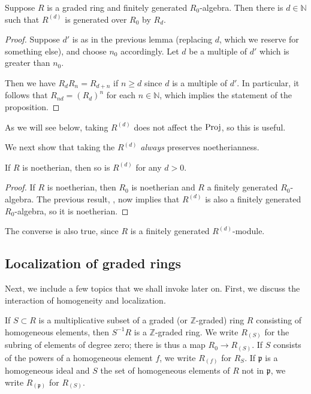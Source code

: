 \begin{proposition} 
Suppose $R$ is a graded ring and finitely generated $R_0$-algebra. Then there
is $d \in \mathbb{N}$ such that $R^{(d)}$ is generated over $R_0$ by $R_d$.
\end{proposition} 
\begin{proof} 
Suppose $d'$ is as in the previous lemma (replacing $d$, which we reserve for
something else), and choose $n_0$ accordingly. Let $d$ be a multiple of $d'$
which is greater than $n_0$.

Then we have $R_d R_n = R_{d+n}$ if $n \geq d$ since $d$ is a multiple of $d'$.
In particular, it follows that $R_{nd} = (R_d)^n$ for each $n \in \mathbb{N}$,
which implies the statement of the proposition.
\end{proof} 

As we will see below, taking $R^{(d)}$ does not affect the $\operatorname{Proj}$, so this is
useful.

We next show that taking the $R^{(d)}$ \emph{always} preserves noetherianness.

\begin{proposition} \label{filtnoetherian}
If $R$ is noetherian, then so is $R^{(d)}$ for any $d>0$.
\end{proposition} 
\begin{proof} 
If $R$ is noetherian, then $R_0$ is noetherian and $R$ a finitely generated
$R_0$-algebra. The previous result, ,  now implies that $R^{(d)} $ is also a
finitely generated $R_0$-algebra, so it is noetherian.
\end{proof} 

The converse is also true, since $R$ is a finitely generated $R^{(d)}$-module.

\subsection{Localization of graded rings}
Next, we include a few topics that we shall invoke later on. 
First, we discuss the interaction of homogeneity and localization.

If $S \subset R$ is a multiplicative subset of a graded (or
$\mathbb{Z}$-graded) ring $R$ consisting of homogeneous elements, then $S^{-1}
R$ is a $\mathbb{Z}$-graded ring.  We write $R_{(S)}$ for the subring of
elements of degree zero; there is thus a map $R_0 \to R_{(S)}$.
If $S$ consists of the powers of a homogeneous element $f$, we write $R_{(f)}$
for $R_S$. If $\mathfrak{p}$ is a homogeneous ideal and $S$ the set of
homogeneous elements of $R$ not in $\mathfrak{p}$, we write
$R_{(\mathfrak{p})}$ for $R_{(S)}$.

